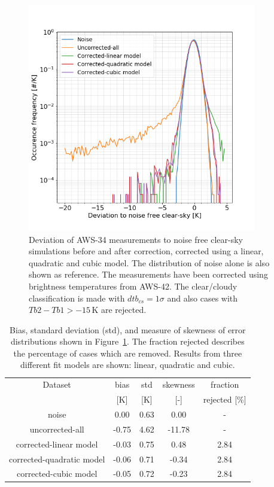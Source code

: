 \documentclass[12pt]{article}
\begin{document}
\begin{figure}[!tb]
	\centering
	\includegraphics[height=100mm]{PDF_corrected_AWS-34_AWS-42_allfits}
	\caption{Deviation of AWS-34 measurements to noise free clear-sky
      simulations before and after correction, corrected using a linear,
      quadratic and cubic model. The distribution of noise alone is also shown
      as reference. The measurements have been corrected using brightness
      temperatures from AWS-42. The clear/cloudy classification is made with $dtb_{cs} = 1\sigma$ and also cases with $Tb2 - Tb1 > -15$\,K are rejected.}
	\label{fig:correction:c34-42:fit}
\end{figure}
%
\begin{table}[!tb]
	\centering
	\begin{tabular}[b]{c|c|c|c|c}
		Dataset  		  &   bias &   std &   skewness  & fraction  \\
		&   [K]  &   [K] & [-] & rejected [\%]\\
		\hline
		noise                     &   0.00 &  0.63 &               0.00 &                - \\
		uncorrected-all           &  -0.75 &  4.62 &             -11.78 &                - \\
		corrected-linear model    &  -0.03 &  0.75 &               0.48 &                2.84 \\
		corrected-quadratic model &  -0.06 &  0.71 &              -0.34 &                2.84 \\
		corrected-cubic model     &  -0.05 &  0.72 &              -0.23 &                2.84 \\
		\hline
	\end{tabular}
	\caption{Bias, standard deviation (std), and measure of skewness of error
      distributions shown in Figure~\ref{fig:correction:c34-42:fit}. The
      fraction rejected describes the percentage of cases which are removed.
      Results from three different fit models are shown: linear, quadratic and
      cubic.}
	\label{tab:correction:stats:34:42:allfits}
\end{table}
\end{document}
